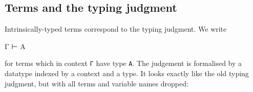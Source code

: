 \hypertarget{terms-and-the-typing-judgment}{%
\subsection{Terms and the typing
judgment}\label{terms-and-the-typing-judgment}}

Intrinsically-typed terms correspond to the typing judgment. We write

\begin{myDisplay}
Γ ⊢ A
\end{myDisplay}

for terms which in context \texttt{Γ} have type \texttt{A}. The
judgement is formalised by a datatype indexed by a context and a type.
It looks exactly like the old typing judgment, but with all terms and
variable names dropped:

